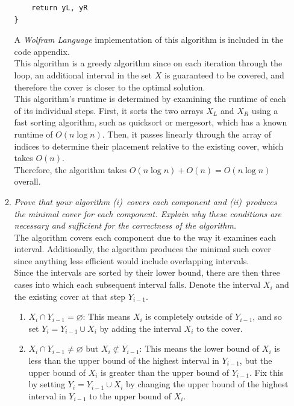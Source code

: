 \documentclass[12pt]{article}
\begin{document}
\begin{enumerate}
\begin{enumerate}
\begin{small}
\begin{verbatim}
    return yL, yR
}
	\end{verbatim}
	\end{small}
	
	A \textit{Wolfram Language} implementation of this algorithm is included in the code appendix.\\
	
	This algorithm is a greedy algorithm since on each iteration through the loop, an additional interval in the set $X$ is guaranteed to be covered, and therefore the cover is closer to the optimal solution.\\
	
	This algorithm's runtime is determined by examining the runtime of each of its individual steps. First, it sorts the two arrays $X_L$ and $X_R$ using a fast sorting algorithm, such as quicksort or mergesort, which has a 
known runtime of $O(n \log n)$. Then, it passes linearly through the array of indices to determine their placement relative to the existing cover, which takes $O(n)$.\\
	
	Therefore, the algorithm takes $O(n \log n) + O(n) = O(n \log n)$ overall.\\

	\item \textit{Prove that your algorithm (i)~covers each component and (ii)~produces the minimal cover for each component. Explain why these conditions are necessary and sufficient for the correctness of the algorithm.}\\
	
	The algorithm covers each component due to the way it examines each interval. Additionally, the algorithm produces the minimal such cover since anything less efficient would include overlapping intervals.\\
	
	Since the intervals are sorted by their lower bound, there are then three cases into which each subsequent interval falls. Denote the interval $X_i$ and the existing cover at that step $Y_{i-1}$.\\
	\begin{enumerate}
        \item $X_i \cap Y_{i-1} = \varnothing$: This means $X_i$ is completely outside of $Y_{i-1}$, and so set $Y_i = Y_{i-1} \cup X_i$ by adding the interval $X_i$ to the cover.\\
        
        \item $X_i \cap Y_{i-1} \neq \varnothing$ but $X_i \not\subset Y_{i-1}$: This means the lower bound of $X_i$ is less than the upper bound of the highest interval in $Y_{i-1}$, but the upper bound of $X_i$ is greater than 
the upper bound of $Y_{i-1}$. Fix this by setting $Y_i = Y_{i-1} \cup X_i$ by changing the upper bound of the highest interval in $Y_{i-1}$ to the upper bound of $X_i$.\\
        

\end{enumerate}
\end{enumerate}
\end{enumerate}
\end{document}
